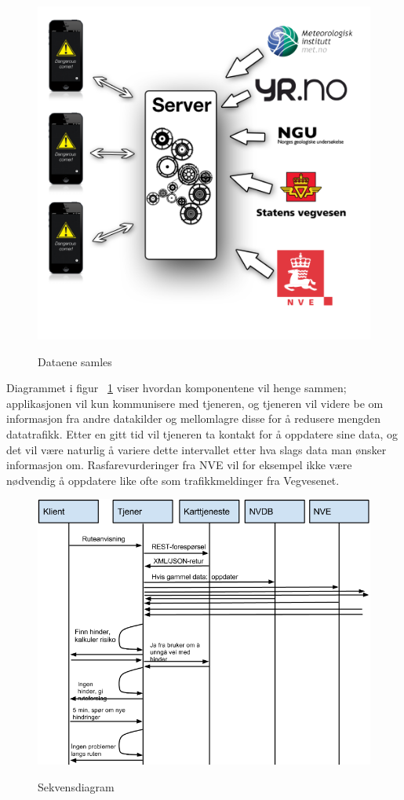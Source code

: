 \documentclass[a4paper,norsk,oneside]{book}
\begin{document}
\begin{figure}[H]
\centering
\includegraphics[scale=0.25]{figs/ark.png}
\label{fig:ark1}
\caption{Dataene samles}
\end{figure}

Diagrammet i figur ~\ref{fig:ark1} viser hvordan komponentene vil henge sammen; applikasjonen vil kun kommunisere med tjeneren, og tjeneren vil videre be om informasjon fra andre datakilder og mellomlagre disse for å redusere mengden datatrafikk. Etter en gitt tid vil tjeneren ta kontakt for å oppdatere sine data, og det vil være naturlig å variere dette intervallet etter hva slags data man ønsker informasjon om. Rasfarevurderinger fra NVE vil for eksempel ikke være nødvendig å oppdatere like ofte som trafikkmeldinger fra Vegvesenet.

\begin{figure}[H]
\centering
\includegraphics[scale=0.5]{figs/Sekvensdiagram.png}
\label{fig:sekvensdiagram}
\caption{Sekvensdiagram}
\end{figure}
\end{document}
